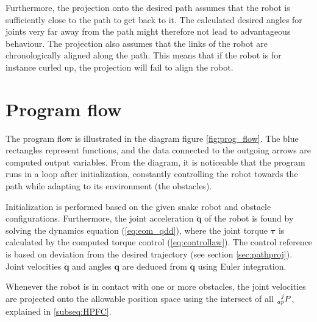 Furthermore, the projection onto the desired path assumes that the robot is sufficiently close to the path to get back to it. The calculated desired angles for joints very far away from the path might therefore not lead to advantageous behaviour. The projection also assumes that the links of the robot are chronologically aligned along the path. This means that if the robot is for instance curled up, the projection will fail to align the robot.



\section{Program flow}

The program flow is illustrated in the diagram figure \ref{fig:prog_flow}. The blue rectangles represent functions, and the data connected to the outgoing arrows are computed output variables. From the diagram, it is noticeable that the program runs in a loop after initialization, constantly controlling the robot towards the path while adapting to its environment (the obstacles).

Initialization is performed based on the given snake robot and obstacle configurations. Furthermore, the joint acceleration $\mathbf{\ddot{q}}$ of the robot is found by solving the dynamics equation (\ref{eq:eom_qdd}), where the joint torque $\boldsymbol{\tau}$ is calculated by the computed torque control (\ref{eq:controllaw}). The control reference is based on deviation from the desired trajectory (see section \ref{sec:pathproj}). Joint velocities $\mathbf{\dot{q}}$ and angles $\mathbf{q}$ are deduced from $\mathbf{\ddot{q}}$ using Euler integration.

Whenever the robot is in contact with one or more obstacles, the joint velocities are projected onto the allowable position space using the intersect of all $\prescript{j}{ap}{P}$, explained in \ref{subseq:HPFC}.

